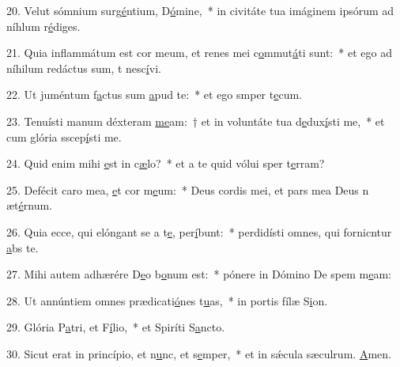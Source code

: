 20. Velut sómnium surg\uline{é}ntium, D\uline{ó}mine,~* in civitáte tua imáginem ipsórum ad níhlum r\uline{é}diges.\par 
21. Quia inflammátum est cor meum, et renes mei c\uline{o}mmut\uline{á}ti sunt:~* et ego ad níhilum redáctus sum, t nesc\uline{í}vi.\par 
22. Ut juméntum f\uline{a}ctus sum \uline{a}pud te:~* et ego smper t\uline{e}cum.\par 
23. Tenuísti manum déxteram \uline{me}am:~† et in voluntáte tua d\uline{e}dux\uline{í}sti me,~* et cum glória sscep\uline{í}sti me.\par 
24. Quid enim mihi \uline{e}st in c\uline{æ}lo?~* et a te quid vólui sper t\uline{e}rram?\par 
25. Defécit caro mea, \uline{e}t cor m\uline{e}um:~* Deus cordis mei, et pars mea Deus n æt\uline{é}rnum.\par 
26. Quia ecce, qui elóngant se a t\uline{e}, per\uline{í}bunt:~* perdidísti omnes, qui fornicntur \uline{a}bs te.\par 
27. Mihi autem adhærére D\uline{e}o b\uline{o}num est:~* pónere in Dómino De spem m\uline{e}am:\par 
28. Ut annúntiem omnes prædicati\uline{ó}nes t\uline{u}as,~* in portis fílæ S\uline{i}on.\par 
29. Glória P\uline{a}tri, et F\uline{í}lio,~* et Spiríti S\uline{a}ncto.\par 
30. Sicut erat in princípio, et n\uline{u}nc, et s\uline{e}mper,~* et in sǽcula sæculrum. \uline{A}men.\par 
